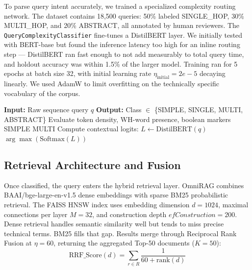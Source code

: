 \documentclass[conference]{IEEEtran}
\begin{document}
To parse query intent accurately, we trained a specialized complexity routing network. The dataset contains 18,500 queries: 50\% labeled SINGLE\_HOP, 30\% MULTI\_HOP, and 20\% ABSTRACT, all annotated by human reviewers. The \texttt{QueryComplexityClassifier} fine-tunes a DistilBERT layer. We initially tested with BERT-base but found the inference latency too high for an inline routing step --- DistilBERT ran fast enough to not add measurably to total query time, and holdout accuracy was within 1.5\% of the larger model. Training ran for 5 epochs at batch size 32, with initial learning rate $\eta_{\text{initial}} = 2e-5$ decaying linearly. We used AdamW to limit overfitting on the technically specific vocabulary of the corpus.

\begin{algorithm}[htbp]
\caption{Query Complexity Classification Protocol}
\label{alg:classify}
\begin{algorithmic}[1]
\STATE \textbf{Input:} Raw sequence query $q$
\STATE \textbf{Output:} Class $\in$ \{SIMPLE, SINGLE, MULTI, ABSTRACT\}
\STATE Evaluate token density, WH-word presence, boolean markers
    \RETURN SIMPLE
    \RETURN MULTI
\ELSE
    \STATE Compute contextual logits: $L \leftarrow \text{DistilBERT}(q)$
    \RETURN $\arg\max(\text{Softmax}(L))$
\ENDIF
\end{algorithmic}
\end{algorithm}

\subsection{Retrieval Architecture and Fusion}

Once classified, the query enters the hybrid retrieval layer. OmniRAG combines BAAI/bge-large-en-v1.5 dense embeddings \cite{xiao2024bge, wang2024e5} with sparse BM25 probabilistic retrieval. The FAISS HNSW index uses embedding dimension $d = 1024$, maximal connections per layer $M = 32$, and construction depth $efConstruction = 200$. Dense retrieval handles semantic similarity well but tends to miss precise technical terms. BM25 fills that gap. Results merge through Reciprocal Rank Fusion at $\eta = 60$, returning the aggregated Top-50 documents ($K = 50$):
\begin{equation}
\text{RRF\_Score}(d) = \sum_{r \in R} \frac{1}{60 + \text{rank}(d)}
\end{equation}
\end{document}
